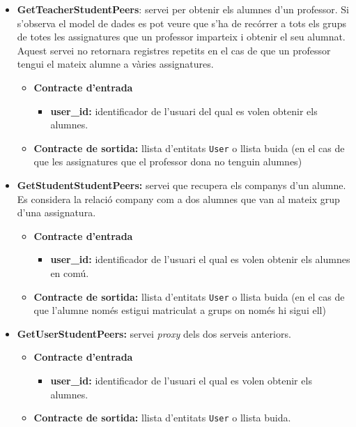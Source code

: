 \begin{itemize}
			\item \textbf{GetTeacherStudentPeers}: servei per obtenir els alumnes d'un professor. Si s'observa el model de dades es pot veure que s'ha de recórrer a tots els grups de totes les assignatures que un professor imparteix i obtenir el seu alumnat. Aquest servei no retornara registres repetits en el cas de que un professor tengui el mateix alumne a vàries assignatures.
				\begin{itemize}
					\item \textbf{Contracte d'entrada}
						\begin{itemize}
							\item \textbf{user\_id:} identificador de l'usuari del qual es volen obtenir els alumnes.
						\end{itemize}
					\item \textbf{Contracte de sortida:} llista d'entitats \texttt{User} o llista buida (en el cas de que les assignatures que el professor dona no tenguin alumnes)
				\end{itemize}
			
			\item \textbf{GetStudentStudentPeers:} servei que recupera els companys d'un alumne. Es considera la relació company com a dos alumnes que van al mateix grup d'una assignatura.
			
				\begin{itemize}
					\item \textbf{Contracte d'entrada}
						\begin{itemize}
							\item \textbf{user\_id:} identificador de l'usuari el qual es volen obtenir els alumnes en comú.
						\end{itemize}
					\item \textbf{Contracte de sortida:} llista d'entitats \texttt{User} o llista buida (en el cas de que l'alumne només estigui matriculat a grups on només hi sigui ell)
				\end{itemize}
				
				
			\item \textbf{GetUserStudentPeers:} servei \emph{proxy} dels dos serveis anteriors.
			
				\begin{itemize}
					\item \textbf{Contracte d'entrada}
						\begin{itemize}
							\item \textbf{user\_id:} identificador de l'usuari el qual es volen obtenir els alumnes.
						\end{itemize}
					\item \textbf{Contracte de sortida:} llista d'entitats \texttt{User} o llista buida.
				\end{itemize}
				

\end{itemize}
